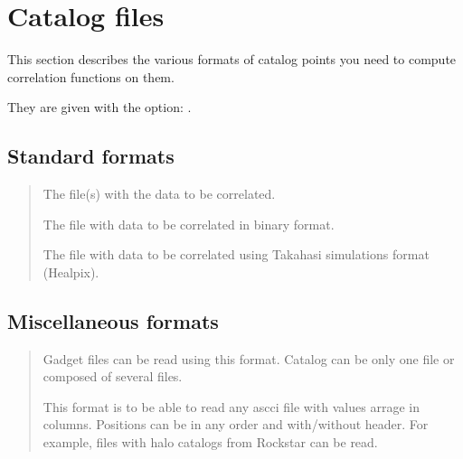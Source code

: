 \documentclass[letterpaper,10pt,english]{sphinxmanual}
\begin{document}
\sphinxstepscope


\chapter{Catalog files}
\label{\detokenize{catalog_files:catalog-files}}\label{\detokenize{catalog_files::doc}}
\sphinxAtStartPar
This section describes the various formats of catalog points you need to compute correlation functions on them.

\sphinxAtStartPar
They are given with the option: .


\section{Standard formats}
\label{\detokenize{catalog_files:standard-formats}}\begin{quote}\begin{description}
\sphinxAtStartPar
The file(s) with the data to be correlated.

\sphinxAtStartPar
The file with data to be correlated in binary format.

\sphinxAtStartPar
The file with data to be correlated using Takahasi simulations format (Healpix).

\end{description}\end{quote}


\section{Miscellaneous formats}
\label{\detokenize{catalog_files:miscellaneous-formats}}\begin{quote}\begin{description}
\sphinxAtStartPar
Gadget files can be read using this format. Catalog can be only one file or composed of several files.

\sphinxAtStartPar
This format is to be able to read any ascci file with values arrage in columns. Positions can be in any order and with/without header. For example, files with halo catalogs from Rockstar can be read.

\end{description}\end{quote}
\end{document}
